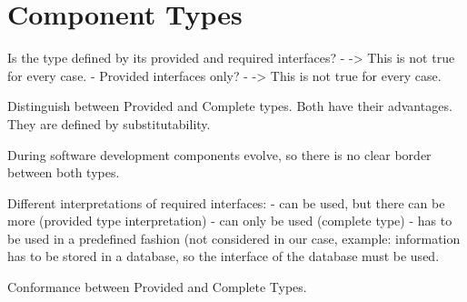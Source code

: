 \section{Component Types}
Is the type defined by its provided and required interfaces?
-	-> This is not true for every case.
-	Provided interfaces only?
-	-> This is not true for every case.

Distinguish between Provided and Complete types. Both have their advantages. They are defined by substitutability. 

During software development components evolve, so there is no clear border between both types.

Different interpretations of required interfaces:
-	can be used, but there can be more (provided type interpretation)
-	can only be used (complete type)
-	has to be used in a predefined fashion (not considered in our case, example: information has to be stored in a database, so the interface of the database must be used.

Conformance between Provided and Complete Types.
